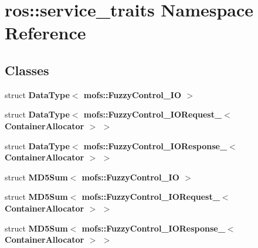 \section{ros\-:\-:service\-\_\-traits Namespace Reference}
\label{namespaceros_1_1service__traits}
\subsection*{Classes}
\begin{DoxyCompactItemize}
\item 
struct {\bf Data\-Type$<$ mofs\-::\-Fuzzy\-Control\-\_\-\-I\-O $>$}
\item 
struct {\bf Data\-Type$<$ mofs\-::\-Fuzzy\-Control\-\_\-\-I\-O\-Request\-\_\-$<$ Container\-Allocator $>$ $>$}
\item 
struct {\bf Data\-Type$<$ mofs\-::\-Fuzzy\-Control\-\_\-\-I\-O\-Response\-\_\-$<$ Container\-Allocator $>$ $>$}
\item 
struct {\bf M\-D5\-Sum$<$ mofs\-::\-Fuzzy\-Control\-\_\-\-I\-O $>$}
\item 
struct {\bf M\-D5\-Sum$<$ mofs\-::\-Fuzzy\-Control\-\_\-\-I\-O\-Request\-\_\-$<$ Container\-Allocator $>$ $>$}
\item 
struct {\bf M\-D5\-Sum$<$ mofs\-::\-Fuzzy\-Control\-\_\-\-I\-O\-Response\-\_\-$<$ Container\-Allocator $>$ $>$}
\end{DoxyCompactItemize}

